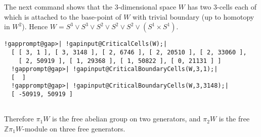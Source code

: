 \documentclass[a4paper,11pt]{report}
\begin{document}
{{\begin{Verbatim}[commandchars=!@|,fontsize=\small,frame=single,label=Example]
\end{Verbatim}
 

The next command shows that the $3$-dimensional space $W$ has two $3$-cells each of which is attached to the base-point of $W$ with trivial boundary (up to homotopy in $W^2$). Hence $W = S^3\vee S^3\vee S^2 \vee S^2 \vee S^2 \vee (S^1\times S^1)$. 
\begin{Verbatim}[commandchars=!@|,fontsize=\small,frame=single,label=Example]
  !gapprompt@gap>| !gapinput@CriticalCells(W);|
  [ [ 3, 1 ], [ 3, 3148 ], [ 2, 6746 ], [ 2, 20510 ], [ 2, 33060 ], 
    [ 2, 50919 ], [ 1, 29368 ], [ 1, 50822 ], [ 0, 21131 ] ]
  !gapprompt@gap>| !gapinput@CriticalBoundaryCells(W,3,1);|
  [  ]
  !gapprompt@gap>| !gapinput@CriticalBoundaryCells(W,3,3148);|
  [ -50919, 50919 ]
  
\end{Verbatim}
 

 Therefore $\pi_1W$ is the free abelian group on two generators, and $\pi_2W$ is the free $\mathbb Z\pi_1W$-module on three free generators. }

 }

 
\end{document}
